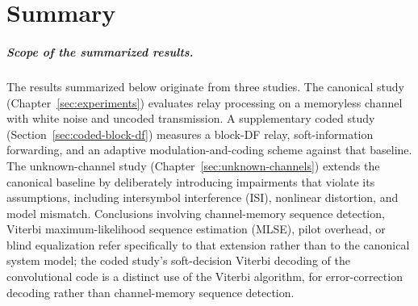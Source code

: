 \chapter{Summary}\label{sec:summary}
\paragraph{Scope of the summarized results.} The results summarized below originate from three studies. The canonical study (Chapter~\ref{sec:experiments}) evaluates relay processing on a memoryless channel with white noise and uncoded transmission. A supplementary coded study (Section~\ref{sec:coded-block-df}) measures a block-DF relay, soft-information forwarding, and an adaptive modulation-and-coding scheme against that baseline. The unknown-channel study (Chapter~\ref{sec:unknown-channels}) extends the canonical baseline by deliberately introducing impairments that violate its assumptions, including intersymbol interference (ISI), nonlinear distortion, and model mismatch. Conclusions involving channel-memory sequence detection, Viterbi maximum-likelihood sequence estimation (MLSE), pilot overhead, or blind equalization refer specifically to that extension rather than to the canonical system model; the coded study's soft-decision Viterbi decoding of the convolutional code is a distinct use of the Viterbi algorithm, for error-correction decoding rather than channel-memory sequence detection.

